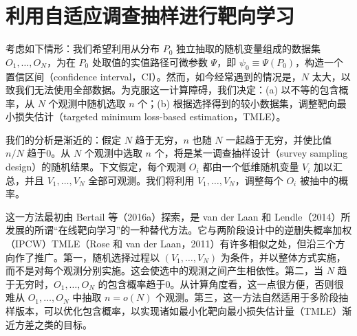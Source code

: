 \chapter{利用自适应调查抽样进行靶向学习}
\label{ch:adaptive-survey-sampling}

\begin{sourcebox}
考虑如下情形：我们希望利用从分布 $P_0$ 独立抽取的随机变量组成的数据集 $O_1,\ldots,O_N$，为在 $P_0$ 处取值的实值路径可微参数 $\Psi$，即 $\psi_0\equiv\Psi(P_0)$，构造一个置信区间（confidence interval，CI）。然而，如今经常遇到的情况是，$N$ 太大，以致我们无法使用全部数据。为克服这一计算障碍，我们决定：(a) 以不等的包含概率，从 $N$ 个观测中随机选取 $n$ 个；(b) 根据选择得到的较小数据集，调整靶向最小损失估计（targeted minimum loss-based estimation，TMLE）。
\end{sourcebox}

我们的分析是渐近的：假定 $N$ 趋于无穷，$n$ 也随 $N$ 一起趋于无穷，并使比值 $n/N$ 趋于0。从 $N$ 个观测中选取 $n$ 个，将是某一调查抽样设计（survey sampling design）的随机结果。下文假定，每个观测 $O_i$ 都由一个低维随机变量 $V_i$ 加以汇总，并且 $V_1,\ldots,V_N$ 全部可观测。我们将利用 $V_1,\ldots,V_N$，调整每个 $O_i$ 被抽中的概率。

这一方法最初由 Bertail 等（2016a）探索，是 van der Laan 和 Lendle（2014）所发展的所谓“在线靶向学习”的一种替代方法。它与两阶段设计中的逆删失概率加权（IPCW）TMLE（Rose 和 van der Laan，2011）有许多相似之处，但沿三个方向作了推广。第一，随机选择过程以 $(V_1,\ldots,V_N)$ 为条件，并以整体方式实施，而不是对每个观测分别实施。这会使选中的观测之间产生相依性。第二，当 $N$ 趋于无穷时，$O_1,\ldots,O_N$ 的包含概率趋于0。从计算角度看，这一点很方便，否则很难从 $O_1,\ldots,O_N$ 中抽取 $n=o(N)$ 个观测。第三，这一方法自然适用于多阶段抽样版本，可以优化包含概率，以实现诸如最小化靶向最小损失估计量（TMLE）渐近方差之类的目标。


